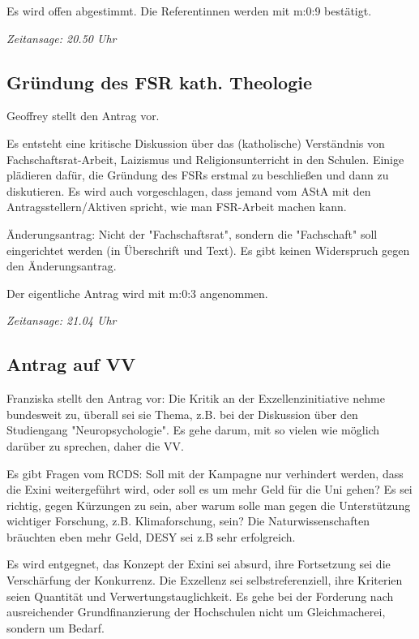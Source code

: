 \documentclass[ngerman,headheight=70pt]{scrartcl}
\begin{document}
    Es wird offen abgestimmt. Die Referentinnen werden mit m:0:9 bestätigt.

    \textit{Zeitansage: 20.50 Uhr}

    \subsection{Gründung des FSR kath. Theologie}

    Geoffrey stellt den Antrag vor.

    Es entsteht eine kritische Diskussion über das (katholische) Verständnis von
    Fachschaftsrat-Arbeit, Laizismus und Religionsunterricht in den Schulen.
    Einige plädieren dafür, die Gründung des FSRs erstmal zu beschließen und
    dann zu diskutieren. Es wird auch vorgeschlagen, dass jemand vom AStA mit
    den Antragsstellern/Aktiven spricht, wie man FSR-Arbeit machen kann.

    Änderungsantrag: Nicht der "Fachschaftsrat", sondern die "Fachschaft" soll
    eingerichtet werden (in Überschrift und Text). Es gibt keinen Widerspruch
    gegen den Änderungsantrag.

    Der eigentliche Antrag wird mit m:0:3 angenommen.

    \textit{Zeitansage: 21.04 Uhr}

    \subsection{Antrag auf VV}

    Franziska stellt den Antrag vor: Die Kritik an der Exzellenzinitiative nehme
    bundesweit zu, überall sei sie Thema, z.B. bei der Diskussion über den
    Studiengang "Neuropsychologie". Es gehe darum, mit so vielen wie möglich
    darüber zu sprechen, daher die VV.

    Es gibt Fragen vom RCDS: Soll mit der Kampagne nur verhindert werden, dass
    die Exini weitergeführt wird, oder soll es um mehr Geld für die Uni gehen?
    Es sei richtig, gegen Kürzungen zu sein, aber warum solle man gegen die
    Unterstützung wichtiger Forschung, z.B. Klimaforschung, sein? Die Naturwissenschaften
    bräuchten eben mehr Geld, DESY sei z.B sehr erfolgreich.

    Es wird entgegnet, das Konzept der Exini sei absurd, ihre Fortsetzung sei
    die Verschärfung der Konkurrenz. Die Exzellenz sei selbstreferenziell, ihre
    Kriterien seien Quantität und Verwertungstauglichkeit. Es gehe bei der
    Forderung nach ausreichender Grundfinanzierung der Hochschulen nicht um
    Gleichmacherei, sondern um Bedarf.
\end{document}
